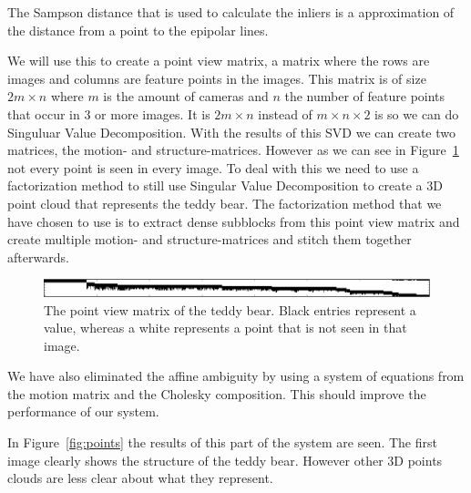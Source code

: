 The Sampson distance that is used to calculate the inliers is a approximation of the distance from a point to the epipolar lines.

We will use this to create a point view matrix, a matrix where the rows are images and columns are feature points in the images.
This matrix is of size $2m \times n$ where $m$ is the amount of cameras and $n$ the number of feature points that occur in 3 or more images. 
It is $2m \times n$ instead of $m \times n \times 2$ is so we can do Singuluar Value Decomposition.
With the results of this SVD we can create two matrices, the motion- and structure-matrices.
However as we can see in Figure~\ref{fig:pvm} not every point is seen in every image.
To deal with this we need to use a factorization method to still use Singular Value Decomposition to create a 3D point cloud that represents the teddy bear.
The factorization method that we have chosen to use is to extract dense subblocks from this point view matrix  and create multiple motion- and structure-matrices and stitch them together afterwards.

\begin{figure}[ht]
	\centering
	\includegraphics[width=\textwidth]{pvm}
	\caption{The point view matrix of the teddy bear. Black entries represent a value, whereas a white represents a point that is not seen in that image.}
	\label{fig:pvm}
\end{figure}

We have also eliminated the affine ambiguity by using a system of equations from the motion matrix and the Cholesky composition. This should improve the performance of our system.

In Figure~\ref{fig:points} the results of this part of the system are seen. The first image clearly shows the structure of the teddy bear. However other 3D points clouds are less clear about what they represent.

